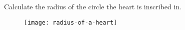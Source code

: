 Calculate the radius of the circle the heart is inscribed in.

\begin{figure}[H]
\centering
\texttt{[image: radius-of-a-heart]}
\end{figure}
